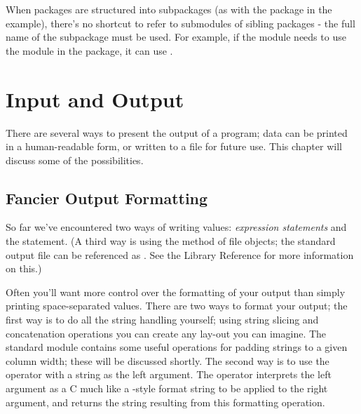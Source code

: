 \documentclass{manual}
\begin{document}
When packages are structured into subpackages (as with the
 package in the example), there's no shortcut to refer
to submodules of sibling packages - the full name of the subpackage
must be used.  For example, if the module
 needs to use the  module
in the  package, it can use .




\chapter{Input and Output \label{io}}

There are several ways to present the output of a program; data can be
printed in a human-readable form, or written to a file for future use.
This chapter will discuss some of the possibilities.


\section{Fancier Output Formatting \label{formatting}}

So far we've encountered two ways of writing values: \emph{expression
statements} and the  statement.  (A third way is using
the  method of file objects; the standard output file
can be referenced as .  See the Library Reference for
more information on this.)

Often you'll want more control over the formatting of your output than
simply printing space-separated values.  There are two ways to format
your output; the first way is to do all the string handling yourself;
using string slicing and concatenation operations you can create any
lay-out you can imagine.  The standard module
 contains some useful operations
for padding strings to a given column width; these will be discussed
shortly.  The second way is to use the \code{\%} operator with a
string as the left argument.  The \code{\%} operator interprets the
left argument as a C much like a -style format
string to be applied to the right argument, and returns the string
resulting from this formatting operation.
\end{document}
